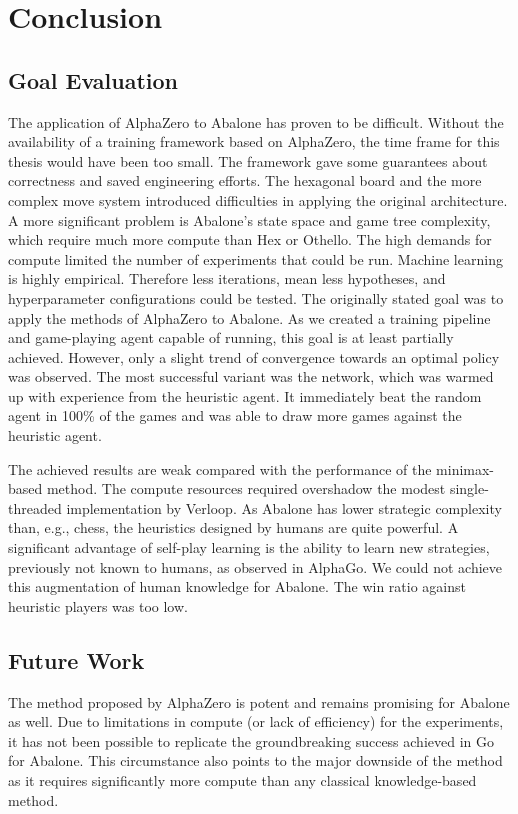 \chapter{Conclusion}
\label{conclusion}

\section{Goal Evaluation}
The application of AlphaZero to Abalone has proven to be difficult. Without the availability of a training framework based on AlphaZero, the time frame for this thesis would have been too small. The framework gave some guarantees about correctness and saved engineering efforts. The hexagonal board and the more complex move system introduced difficulties in applying the original architecture. A more significant problem is Abalone's state space and game tree complexity, which require much more compute than Hex or Othello. The high demands for compute limited the number of experiments that could be run. Machine learning is highly empirical. Therefore less iterations, mean less hypotheses, and hyperparameter configurations could be tested. The originally stated goal was to apply the methods of AlphaZero to Abalone. As we created a training pipeline and game-playing agent capable of running, this goal is at least partially achieved. However, only a slight trend of convergence towards an optimal policy was observed. The most successful variant was the network, which was warmed up with experience from the heuristic agent. It immediately beat the random agent in 100\% of the games and was able to draw more games against the heuristic agent.

The achieved results are weak compared with the performance of the minimax-based method. The compute resources required overshadow the modest single-threaded implementation by Verloop. As Abalone has lower strategic complexity than, e.g., chess, the heuristics designed by humans are quite powerful. A significant advantage of self-play learning is the ability to learn new strategies, previously not known to humans, as observed in AlphaGo. We could not achieve this augmentation of human knowledge for Abalone. The win ratio against heuristic players was too low.

\section{Future Work}
The method proposed by AlphaZero is potent and remains promising for Abalone as well. Due to limitations in compute (or lack of efficiency) for the experiments, it has not been possible to replicate the groundbreaking success achieved in Go for Abalone. This circumstance also points to the major downside of the method as it requires significantly more compute than any classical knowledge-based method.

